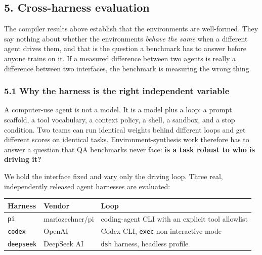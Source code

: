 \documentclass[
]{article}
\begin{document}
\subsection{5. Cross-harness evaluation}\label{cross-harness-evaluation}

The compiler results above establish that the environments are
well-formed. They say nothing about whether the environments
\emph{behave the same} when a different agent drives them, and that is
the question a benchmark has to answer before anyone trains on it. If a
measured difference between two agents is really a difference between
two interfaces, the benchmark is measuring the wrong thing.

\subsubsection{5.1 Why the harness is the right independent
variable}\label{why-the-harness-is-the-right-independent-variable}

A computer-use agent is not a model. It is a model plus a loop: a prompt
scaffold, a tool vocabulary, a context policy, a shell, a sandbox, and a
stop condition. Two teams can run identical weights behind different
loops and get different scores on identical tasks. Environment-synthesis
work therefore has to answer a question that QA benchmarks never face:
\textbf{is a task robust to who is driving it?}

We hold the interface fixed and vary only the driving loop. Three real,
independently released agent harnesses are evaluated:

\begin{longtable}[]{@{}
  >{\raggedright\arraybackslash}p{}
  >{\raggedright\arraybackslash}p{}
  >{\raggedright\arraybackslash}p{}@{}}
\toprule\noalign{}
\begin{minipage}[b]{\linewidth}\raggedright
Harness
\end{minipage} & \begin{minipage}[b]{\linewidth}\raggedright
Vendor
\end{minipage} & \begin{minipage}[b]{\linewidth}\raggedright
Loop
\end{minipage} \\
\midrule\noalign{}
\endhead
\bottomrule\noalign{}
\endlastfoot
\texttt{pi} & mariozechner/pi & coding-agent CLI with an explicit tool
allowlist \\
\texttt{codex} & OpenAI & Codex CLI, \texttt{exec} non-interactive
mode \\
\texttt{deepseek} & DeepSeek AI & \texttt{dsh} harness, headless
profile \\
\end{longtable}
\end{document}
